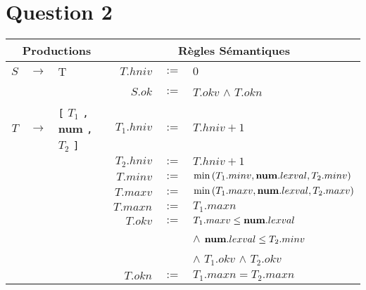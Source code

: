 \documentclass[class=article]{standalone}
\begin{document}
\section*{Question 2}


{
  \hspace{-3cm}
  \begin{tabular}{|rcl|rcl|}
      \hline
      \multicolumn{3}{|c}{\bf Productions} &
      \multicolumn{3}{|c|}{\bf Règles Sémantiques} \\
      \hline
      \hline
      $S$ & $\rightarrow$ & T & $T.hniv$ & $:=$ & $0$ \\
          &               &   & $S.ok$ & $:=$ & $T.okv$ $\wedge$ $T.okn$\\
      \hline
      $T$ & $\rightarrow$ & \lstinline[]$[$ $T_1$ \lstinline[]$,$ {\bf num} \lstinline[]$,$ $T_2$ \lstinline[]$]$ & $T_1.hniv$ & $:=$ & $T.hniv + 1$ \\
          &               &                                                                                       & $T_2.hniv$ & $:=$ & $T.hniv + 1$\\
          &               &                                                                                       & $T.minv$  & $:=$ & $\min\left ( T_1.minv, {\bf num}.lexval, T_2.minv \right )$\\
          &               &                                                                                       & $T.maxv$  & $:=$ & $\min\left ( T_1.maxv, {\bf num}.lexval, T_2.maxv \right )$\\
          &               &                                                                                       & $T.maxn$  & $:=$ & $T_1.maxn$\\
          &               &                                                                                       & $T.okv$   & $:=$ & $T_1.maxv \leq {\bf num}.lexval$\\
          &               &                                                                                       &           &      & $\wedge$ ${\bf num}.lexval \leq T_2.minv$\\
          &               &                                                                                       &           &      & $\wedge$ $T_1.okv$ $\wedge$ $T_2.okv$\\
          &               &                                                                                       & $T.okn$   & $:=$ & $T_1.maxn = T_2.maxn$\\

\end{tabular}}
\end{document}
